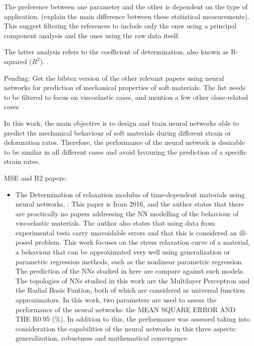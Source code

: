 The preference between one parameter and the other is dependent on the type of application. (explain the main difference between these statistical measurements). This suggest filtering the references to include only the ones using a principal component analysis and the ones using the raw data itself.

The latter analysis refers to the coefficient of determination, also known as R-squared ($R^2$). \cite{aulova2017determination,tho2004artificial,saha2018use,setti2014artificial,xu2019application}. 

Pending: Get the bibtex version of the other relevant papers using neural networks for prediction of mechanical properties of soft materials. The list needs to be filtered to focus on viscoelastic cases, and mention a few other close-related cases

In this work, the main objective is to design and train neural networks able to predict the mechanical behaviour of soft materials during different strain or deformation rates. Therefore, the performance of the neural network is desirable to be similar in all different cases and avoid favouring the prediction of a specific strain rates.



MSE and R2 papers:

\begin{itemize}
    \item The Determination of relaxation modulus of time-dependent materials using neural networks, \cite{aulova2017determination}: This paper is from 2016, and the author states that there are practically no papers addressing the NN modelling of the behaviour of viscoelastic materials. The author also states that using data from experimental tests carry unavoidable errors and that this is considered an ill-posed problem. This work focuses on the stress relaxation curve of a material, a behaviour that can be approximated very well using generalization or parametric regression methods, such as the nonlinear parametric regression. The prediction of the NNs studied in here are compare against such models. The topologies of NNs studied in this work are the Multilayer Perceptron and the Radial Basis Funtion, both of which are considered as universal function approximators. In this work, two parameters are used to assess the performance of the neural networks: the MEAN SQUARE ERROR AND THE R0.95 (\%). In addition to this, the performance was assessed taking into consideration the capabilities of the neural networks in this three aspects: generalization, robustness and mathematical convergence.
\end{itemize}




